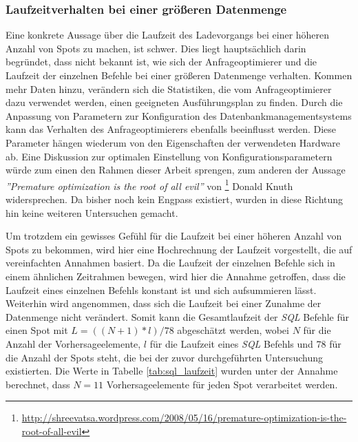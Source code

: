 \subsubsection{Laufzeitverhalten bei einer größeren Datenmenge}
Eine konkrete Aussage über die Laufzeit des Ladevorgangs bei einer
höheren Anzahl von Spots zu machen, ist schwer. Dies liegt
hauptsächlich darin begründet, dass nicht bekannt ist, wie sich der
Anfrageoptimierer und die Laufzeit der einzelnen Befehle bei einer
größeren Datenmenge verhalten. Kommen mehr Daten hinzu, verändern sich
die Statistiken, die vom Anfrageoptimierer dazu verwendet werden,
einen geeigneten Ausführungsplan zu finden. Durch die Anpassung von
Parametern zur Konfiguration des Datenbankmanagementsystems kann das
Verhalten des Anfrageoptimierers ebenfalls beeinflusst werden. Diese
Parameter hängen wiederum von den Eigenschaften der verwendeten
Hardware ab. Eine Diskussion zur optimalen Einstellung von
Konfigurationsparametern würde zum einen den Rahmen dieser Arbeit
sprengen, zum anderen der Aussage \textit{''Premature optimization is
  the root of all evil''} von
\footnote{\url{http://shreevatsa.wordpress.com/2008/05/16/premature-optimization-is-the-root-of-all-evil}}
Donald Knuth widersprechen. Da bisher noch kein Engpass existiert,
wurden in diese Richtung hin keine weiteren Untersuchen gemacht.

Um trotzdem ein gewisses Gefühl für die Laufzeit bei einer höheren
Anzahl von Spots zu bekommen, wird hier eine Hochrechnung der Laufzeit
vorgestellt, die auf vereinfachten Annahmen basiert. Da die Laufzeit
der einzelnen Befehle sich in einem ähnlichen Zeitrahmen bewegen, wird
hier die Annahme getroffen, dass die Laufzeit eines einzelnen Befehls
konstant ist und sich aufsummieren lässt. Weiterhin wird angenommen,
dass sich die Laufzeit bei einer Zunahme der Datenmenge nicht
verändert. Somit kann die Gesamtlaufzeit der \textit{SQL} Befehle für
einen Spot mit $L = ((N+1) * l) / 78$ abgeschätzt werden, wobei $N$
für die Anzahl der Vorhersageelemente, $l$ für die Laufzeit eines
\textit{SQL} Befehls und 78 für die Anzahl der Spots steht, die bei
der zuvor durchgeführten Untersuchung existierten. Die Werte in
Tabelle \ref{tab:sql_laufzeit} wurden unter der Annahme berechnet,
dass $N=11$ Vorhersageelemente für jeden Spot verarbeitet werden.

